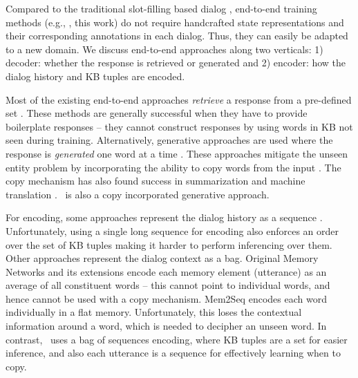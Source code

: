 Compared to the traditional slot-filling based dialog  \cite{williams2007partially,wen2017network,williams2017hybrid}, 
end-to-end training methods (e.g., \cite{BordesW16}, this work) do not require handcrafted state representations and their corresponding annotations in each dialog. Thus, they can easily be adapted to a new domain.  We discuss end-to-end approaches along two verticals: 1) decoder: whether the response is retrieved or generated and 2) encoder: how the dialog history and KB tuples are encoded.

Most of the existing end-to-end approaches  {\em retrieve} a response from a pre-defined set \cite{BordesW16,liu2017gated,seo2016query}. These methods are generally successful when they have to provide boilerplate responses -- they cannot construct responses by using words in KB not seen during training. 
Alternatively, generative approaches are used where the response is {\em generated} one word at a time \cite{eric2017copy,mem2seq}. These approaches mitigate the unseen entity problem by incorporating the ability to copy words from the input \cite{vinyals2015pointer,gu2016incorporating}. The copy mechanism has also found success in summarization \cite{nallapati2016abstractive,see2017get} and machine translation \cite{ptr-unk}. \sys\ is also a copy incorporated generative approach. 

For encoding, some approaches represent the dialog history as a sequence \cite{eric2017copy,ptr-unk}. Unfortunately, using a single long sequence for encoding also enforces an order over the set of KB tuples making it harder to perform inferencing over them. Other approaches represent the dialog context as a bag. Original Memory Networks \cite{BordesW16} and its extensions encode each memory element (utterance) as an average of all constituent words -- this cannot point to individual words, and hence cannot be used with a copy mechanism. Mem2Seq encodes each word individually in a flat memory. Unfortunately, this loses the contextual information around a word, which is needed to decipher an unseen word. In contrast, \sys\ uses a bag of sequences encoding, where KB tuples are a set for easier inference, and also each utterance is a sequence for effectively learning when to copy.  


